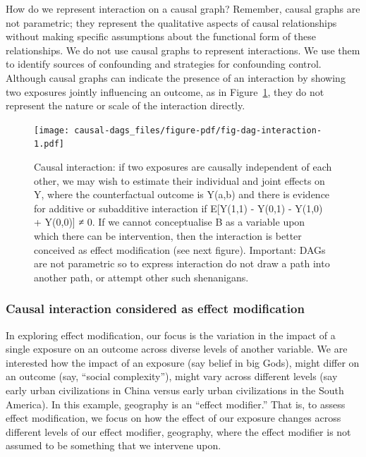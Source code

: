 \documentclass[
  singlecolumn]{report}
\begin{document}
How do we represent interaction on a causal graph? Remember, causal
graphs are not parametric; they represent the qualitative aspects of
causal relationships without making specific assumptions about the
functional form of these relationships. We do not use causal graphs to
represent interactions. We use them to identify sources of confounding
and strategies for confounding control. Although causal graphs can
indicate the presence of an interaction by showing two exposures jointly
influencing an outcome, as in Figure~\ref{fig-dag-interaction}, they do
not represent the nature or scale of the interaction directly.

\begin{figure}

{\centering \texttt{[image: causal-dags\_files/figure-pdf/fig-dag-interaction-1.pdf]}

}

\caption{\label{fig-dag-interaction}Causal interaction: if two exposures
are causally independent of each other, we may wish to estimate their
individual and joint effects on Y, where the counterfactual outcome is
Y(a,b) and there is evidence for additive or subadditive interaction if
E{[}Y(1,1) - Y(0,1) - Y(1,0) + Y(0,0){]} ≠ 0. If we cannot conceptualise
B as a variable upon which there can be intervention, then the
interaction is better conceived as effect modification (see next
figure). Important: DAGs are not parametric so to express interaction do
not draw a path into another path, or attempt other such shenanigans.}

\end{figure}

\hypertarget{causal-interaction-considered-as-effect-modification}{%
\subsubsection{\texorpdfstring{\textbf{Causal interaction considered as
effect
modification}}{Causal interaction considered as effect modification}}\label{causal-interaction-considered-as-effect-modification}}

In exploring effect modification, our focus is the variation in the
impact of a single exposure on an outcome across diverse levels of
another variable. We are interested how the impact of an exposure (say
belief in big Gods), might differ on an outcome (say, ``social
complexity''), might vary across different levels (say early urban
civilizations in China versus early urban civilizations in the South
America). In this example, geography is an ``effect modifier.'' That is,
to assess effect modification, we focus on how the effect of our
exposure changes across different levels of our effect modifier,
geography, where the effect modifier is not assumed to be something that
we intervene upon.
\end{document}
